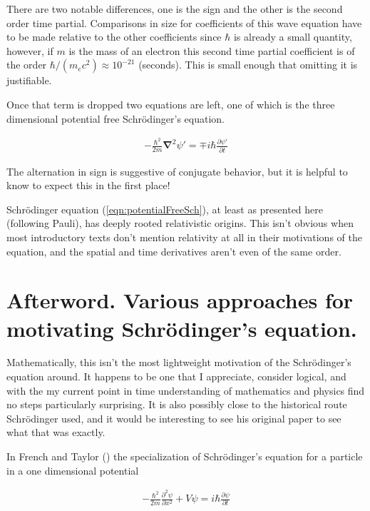 \documentclass[]{eliblog}
\newcommand{\spacegrad}[0]{\boldsymbol{\nabla}}
\begin{document}
There are two notable differences, one is the sign and the other is the second order time partial.  
Comparisons in size for coefficients of this wave equation have to be made relative to the other coefficients since $\hbar$ is already a small quantity,
however, if $m$ is the mass of an electron this second time partial coefficient is of the order $\hbar/(m_e c^2) \approx 10^{-21}$ (seconds).  This is
small enough that omitting it is justifiable.

Once that term is dropped two equations are left, one of which is the three dimensional potential free Schr\"{o}dinger's equation.

\begin{align}\label{eqn:potentialFreeSch}
-\frac{\hbar^2}{2m} \spacegrad^2 \psi' = \mp i \hbar \frac{\partial \psi'}{\partial t}
\end{align}

The alternation in sign is suggestive of conjugate behavior, but it is helpful to know to expect this in the first place!

Schr\"{o}dinger equation (\ref{eqn:potentialFreeSch}), at least as presented here (following Pauli), has deeply rooted relativistic origins.
This isn't obvious when most introductory texts don't mention relativity at all in their motivations of the equation, and
the spatial and time derivatives aren't even of the same order.

\section{Afterword.  Various approaches for motivating Schr\"{o}dinger's equation.}

Mathematically, this isn't the most lightweight motivation of the Schr\"{o}dinger's equation around.  It happens to be one that I appreciate, consider
logical, and with the my current point in time understanding of mathematics and physics find no steps particularly surprising.
It is also possibly close to the historical route Schr\"{o}dinger used, and it would be interesting to see his original paper to see what that was exactly.

In French and Taylor (\cite{french1998iqp}) the specialization of Schr\"{o}dinger's equation for a particle in a one dimensional potential

\begin{align}\label{eqn:oneDimSch}
-\frac{\hbar^2}{2m} \frac{\partial^2 \psi}{\partial x^2} + V\psi = i \hbar \frac{\partial \psi}{\partial t}
\end{align}
\end{document}
